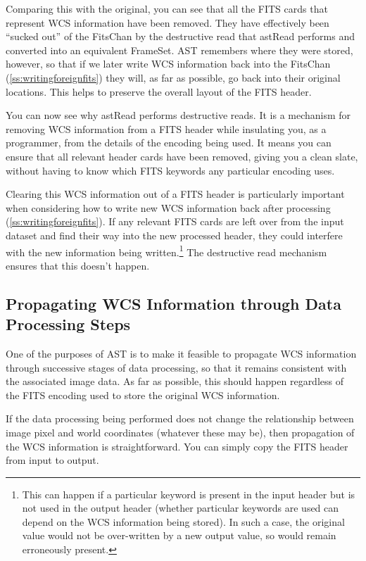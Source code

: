 \documentclass[twoside,11pt]{article}
\newcommand{\htmlref}[2]{#1}
\newcommand{\secref}[1]{\S\ref{#1}}
\renewcommand{\secref}[1]{\ref{#1}}
\begin{document}
Comparing this with the original, you can see that all the FITS cards
that represent WCS information have been removed. They have
effectively been ``sucked out'' of the FitsChan by the destructive
read that \htmlref{astRead}{astRead} performs and converted into an equivalent
FrameSet. AST remembers where they were stored, however, so that if we
later write WCS information back into the FitsChan
(\secref{ss:writingforeignfits}) they will, as far as possible, go
back into their original locations. This helps to preserve the overall
layout of the FITS header.

You can now see why astRead performs destructive reads. It is a
mechanism for removing WCS information from a FITS header while
insulating you, as a programmer, from the details of the encoding
being used. It means you can ensure that all relevant header cards
have been removed, giving you a clean slate, without having to know
which FITS keywords any particular encoding uses.

Clearing this WCS information out of a FITS header is particularly
important when considering how to write new WCS information back after
processing (\secref{ss:writingforeignfits}). If any relevant FITS
cards are left over from the input dataset and find their way into the
new processed header, they could interfere with the new information
being written.\footnote{This can happen if a particular keyword is
present in the input header but is not used in the output header
(whether particular keywords are used can depend on the WCS
information being stored). In such a case, the original value would
not be over-written by a new output value, so would remain erroneously
present.} The destructive read mechanism ensures that this doesn't
happen.

\subsection{\label{ss:propagatingwcsinformation}Propagating WCS Information through Data Processing Steps}

One of the purposes of AST is to make it feasible to propagate WCS
information through successive stages of data processing, so that it
remains consistent with the associated image data. As far as possible,
this should happen regardless of the FITS encoding used to store the
original WCS information.

If the data processing being performed does not change the
relationship between image pixel and world coordinates (whatever these
may be), then propagation of the WCS information is
straightforward. You can simply copy the FITS header from input to
output.
\end{document}
